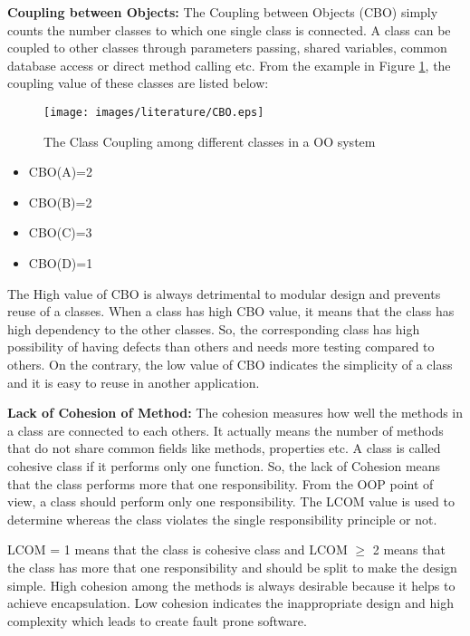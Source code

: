 \documentclass[12pt]{report}
\begin{document}


\textbf{Coupling between Objects:}
The Coupling between Objects (CBO) simply counts the number classes to which one single class is connected. A class can be coupled to other classes through parameters passing, shared variables, common database access or direct method calling etc. From the example in Figure \ref{CBO_codeMetrics}, the coupling value of these classes are listed below: 
\begin{figure}[h!]
  \centering
    \texttt{[image: images/literature/CBO.eps]}
		\caption{The Class Coupling among different classes in a OO system}
		\label{CBO_codeMetrics}
\end{figure}

\begin{itemize}
	\item CBO(A)=2
	\item CBO(B)=2
	\item CBO(C)=3
	\item CBO(D)=1
\end{itemize}

The High value of CBO is always detrimental to modular design and prevents reuse of a classes. When a class has high CBO value, it means that the class has high dependency to the other classes. So, the corresponding class has high possibility of having defects than others and needs more testing compared to others. On the contrary, the low value of CBO indicates the simplicity of a class and it is easy to reuse in another application. 


\textbf{Lack of Cohesion of Method:} 
The cohesion measures how well the methods in a class are connected to each others. It actually means the number of methods that do not share common fields like methods, properties etc. A class is called cohesive class if it performs only one function. So, the lack of Cohesion means that the class performs more that one responsibility. From the OOP point of view, a class should perform only one responsibility. The LCOM value is used to determine whereas the class violates the single responsibility principle or not. 

LCOM = 1 means that the class is cohesive class and LCOM $\geq$ 2 means that the class has more that one responsibility and should be split to make the design simple. High cohesion among the methods is always desirable because it helps to achieve encapsulation. Low cohesion indicates the inappropriate design and high complexity which leads to create fault prone software.   
\end{document}
